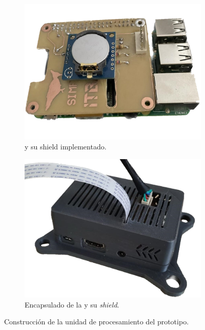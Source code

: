 \begin{figure}[H]
	\ContinuedFloat
	\centering
    \begin{subfigure}{0.3\textwidth}
    	\centering
     	\includegraphics[width=\linewidth]{ImagenesConstruccion del prototipo/rpiyshield_prototipo}		
		\caption{\rspi y su shield implementado.}
		\label{fig:rpiyshield_prototipo}
    \end{subfigure}\hspace*{2cm}
    \begin{subfigure}{0.3\textwidth}
    	\centering
        \includegraphics[width=\linewidth]{ImagenesConstruccion del prototipo/rpiyshield_encapsulado_prototipo}
        \caption{Encapsulado de la \rspi y su \textit{shield}.}
		\label{fig:casing_rpi}
    \end{subfigure}
	\caption{Construcción de la unidad de procesamiento del prototipo.}
	\label{fig:up_prototipo}
\end{figure}


